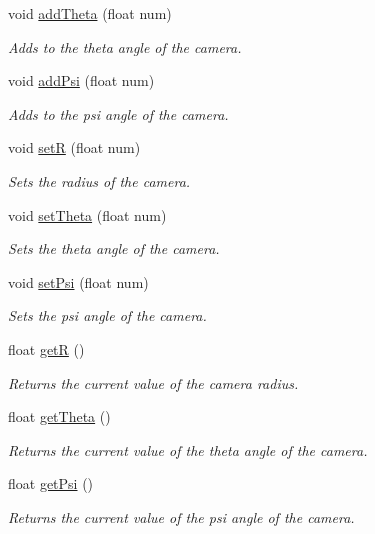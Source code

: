 \begin{DoxyCompactItemize}
void \hyperlink{class_spherical_camera_a2245b8a04f20971f46b6ac81d38c9df5}{add\+Theta} (float num)
\begin{DoxyCompactList}\small\item\em Adds to the theta angle of the camera. \end{DoxyCompactList}\item 
void \hyperlink{class_spherical_camera_aa730ca48a2b4ce7ef2bef71d7fe01cdb}{add\+Psi} (float num)
\begin{DoxyCompactList}\small\item\em Adds to the psi angle of the camera. \end{DoxyCompactList}\item 
void \hyperlink{class_spherical_camera_a0f2d107b948ac04408131df982454d0f}{setR} (float num)
\begin{DoxyCompactList}\small\item\em Sets the radius of the camera. \end{DoxyCompactList}\item 
void \hyperlink{class_spherical_camera_a5ba561ae714920e6d67da11397f21a3a}{set\+Theta} (float num)
\begin{DoxyCompactList}\small\item\em Sets the theta angle of the camera. \end{DoxyCompactList}\item 
void \hyperlink{class_spherical_camera_a7fd5a496453b9a7deb6acca7a785519f}{set\+Psi} (float num)
\begin{DoxyCompactList}\small\item\em Sets the psi angle of the camera. \end{DoxyCompactList}\item 
float \hyperlink{class_spherical_camera_adb5813e85f77377107927ddd4252e587}{getR} ()
\begin{DoxyCompactList}\small\item\em Returns the current value of the camera radius. \end{DoxyCompactList}\item 
float \hyperlink{class_spherical_camera_a1b6ec70441554aceae0bb10f10684a67}{get\+Theta} ()
\begin{DoxyCompactList}\small\item\em Returns the current value of the theta angle of the camera. \end{DoxyCompactList}\item 
float \hyperlink{class_spherical_camera_a8ca237a1f3e1bdff465d7758cdc9344c}{get\+Psi} ()
\begin{DoxyCompactList}\small\item\em Returns the current value of the psi angle of the camera. \end{DoxyCompactList}\end{DoxyCompactItemize}


